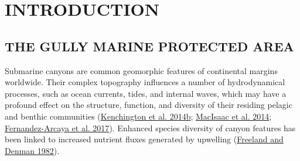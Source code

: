 \documentclass[12pt]{article}\usepackage[]{graphicx}\usepackage[]{color}
\begin{document}

\frontmatter


\renewcommand{\headrulewidth}{0.5pt}  %
\renewcommand{\footrulewidth}{0.5pt}  %

\newcommand{\lt}{\ensuremath <}
\newcommand{\gt}{\ensuremath >}

\newlength{\cslhangindent}
\setlength{\cslhangindent}{1.5em}
\newenvironment{cslreferences}%
  {}%
  {\par}

\hypertarget{sec:introduction}{%
\section{INTRODUCTION}\label{sec:introduction}}

\hypertarget{the-gully-marine-protected-area}{%
\subsection{\texorpdfstring{\textbf{THE GULLY MARINE PROTECTED AREA}}{THE GULLY MARINE PROTECTED AREA}}\label{the-gully-marine-protected-area}}

Submarine canyons are common geomorphic features of continental margins worldwide. Their complex topography influences a number of hydrodynamical processes, such as ocean currents, tides, and internal waves, which may have a profound effect on the structure, function, and diversity of their residing pelagic and benthic communities (\protect\hyperlink{ref-kenchington_2014b}{Kenchington et al. 2014b}; \protect\hyperlink{ref-macisaac_2014}{MacIsaac et al. 2014}; \protect\hyperlink{ref-fernandez-arcaya_2017}{Fernandez-Arcaya et al. 2017}). Enhanced species diversity of canyon features has been linked to increased nutrient fluxes generated by upwelling (\protect\hyperlink{ref-freeland_1982}{Freeland and Denman 1982}).
\end{document}
